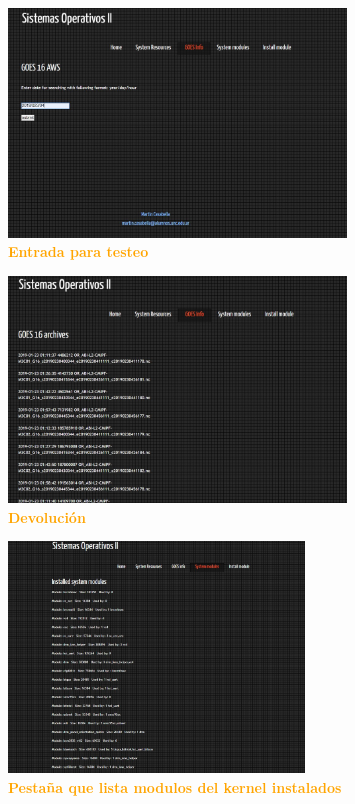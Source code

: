 \documentclass{article}
\begin{document}
\begin{figure}[H]
    \centering
      \includegraphics[width=0.8\textwidth]{figures/3bis.jpg}
       \centering
       \caption{\textbf{\textcolor{Orange}{Entrada para testeo}}}       
    \end{figure}

\begin{figure}[H]
    \centering
      \includegraphics[width=0.8\textwidth]{figures/3bisbis.jpg}
       \centering
       \caption{\textbf{\textcolor{Orange}{Devolución}}}       
    \end{figure}


\begin{figure}[H]
    \centering
      \includegraphics[width=0.7\textwidth]{figures/5.jpg}
       \centering
       \caption{\textbf{\textcolor{Orange}{Pestaña que lista modulos del kernel instalados}}}
    \end{figure}
\end{document}
